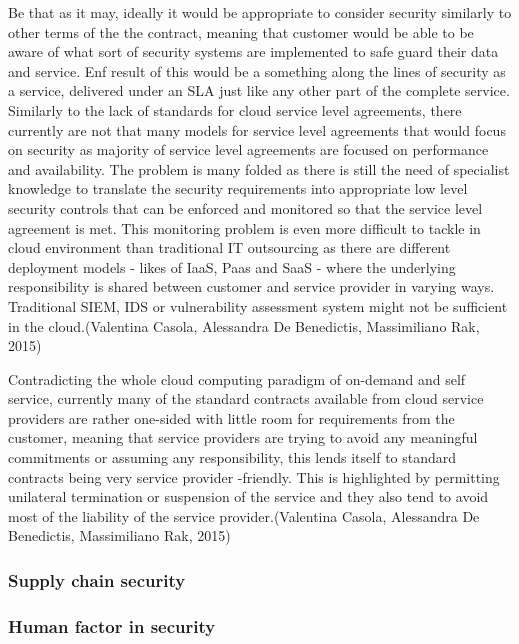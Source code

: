 \documentclass{article}
\begin{document}
Be that as it may, ideally it would be appropriate to consider security similarly to other terms of the the contract, meaning that customer would be able to be aware of what sort of security systems are implemented to safe guard their data and service. Enf result of this would be a something along the lines of security as a service, delivered under an SLA just like any other part of the complete service. Similarly to the lack of standards for cloud service level agreements, there currently are not that many models for service level agreements that would focus on security as majority of service level agreements are focused on performance and availability. The problem is many folded as there is still the need of specialist knowledge to translate the security requirements into appropriate low level security controls that can be enforced and monitored so that the service level agreement is met. This monitoring problem is even more difficult to tackle in cloud environment than traditional IT outsourcing as there are different deployment models - likes of IaaS, Paas and SaaS - where the underlying responsibility is shared between customer and service provider in varying ways. Traditional SIEM, IDS or vulnerability assessment system might not be sufficient in the cloud.(Valentina Casola, Alessandra De Benedictis, Massimiliano Rak, 2015)
\par
Contradicting the whole cloud computing paradigm of on-demand and self service, currently many of the standard contracts available from cloud service providers are rather one-sided with little room for requirements from the customer, meaning that service providers are trying to avoid any meaningful commitments or assuming any responsibility, this lends itself to standard contracts being very service provider -friendly. This is highlighted by permitting unilateral termination or suspension of the service and they also tend to avoid most of the liability of the service provider.(Valentina Casola, Alessandra De Benedictis, Massimiliano Rak, 2015)
\subsubsection{Supply chain security}
\subsubsection{Human factor in security}
\end{document}
